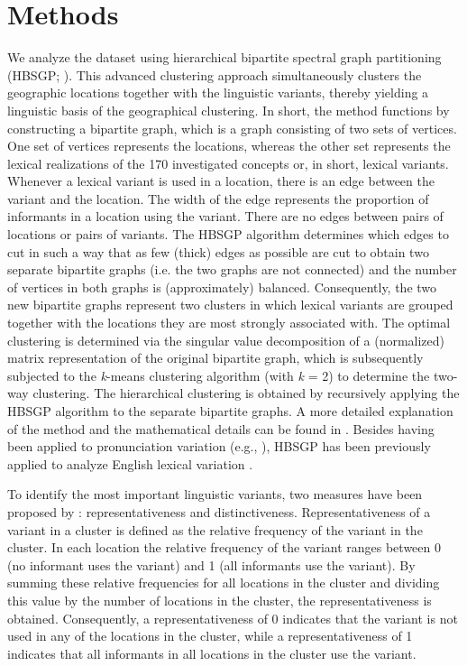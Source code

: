 \documentclass[output=paper]{LSP/langsci}
\begin{document}
\section{Methods}
We analyze the dataset using hierarchical bipartite spectral graph partitioning (HBSGP; \citealt{wieling_bipartite_2011}). This advanced clustering approach simultaneously clusters the geographic locations together with the linguistic variants, thereby yielding a linguistic basis of the geographical clustering. In short, the method functions by constructing a bipartite graph, which is a graph consisting of two sets of vertices. One set of vertices represents the locations, whereas the other set represents the lexical realizations of the 170 investigated concepts or, in short, lexical variants. Whenever a lexical variant is used in a location, there is an edge between the variant and the location. The width of the edge represents the proportion of informants in a location using the variant. There are no edges between pairs of locations or pairs of variants. The HBSGP  algorithm determines which edges to cut in such a way that as few (thick) edges as possible are cut to obtain two separate bipartite graphs (i.e. the two graphs are not connected) and the number of vertices in both graphs is (approximately) balanced. Consequently, the two new bipartite graphs represent two clusters in which lexical variants are grouped together with the locations they are most strongly associated with. The optimal clustering is determined via the singular value decomposition of a (normalized) matrix representation of the original bipartite graph, which is subsequently subjected to the \textit{k}{}-means clustering algorithm (with \textit{k} = 2) to determine the two-way clustering. The hierarchical clustering is obtained by recursively applying the HBSGP algorithm to the separate bipartite graphs. A more detailed explanation of the method and the mathematical details can be found in \citet{wieling_bipartite_2011}. Besides having been applied to pronunciation variation (e.g., \citealt{wieling_bipartite_2011}), HBSGP has been previously applied to analyze English lexical variation \citep{wieling_analyzing_2014}. 

To identify the most important linguistic variants, two measures have been proposed by \citet{wieling_bipartite_2011}: representativeness and distinctiveness. Representativeness of a variant in a cluster is defined as the relative frequency of the variant in the cluster. In each location the relative frequency of the variant ranges between 0 (no informant uses the variant) and 1 (all informants use the variant). By summing these relative frequencies for all locations in the cluster and dividing this value by the number of locations in the cluster, the representativeness is obtained. Consequently, a representativeness of 0 indicates that the variant is not used in any of the locations in the cluster, while a representativeness of 1 indicates that all informants in all locations in the cluster use the variant. 
\end{document}

